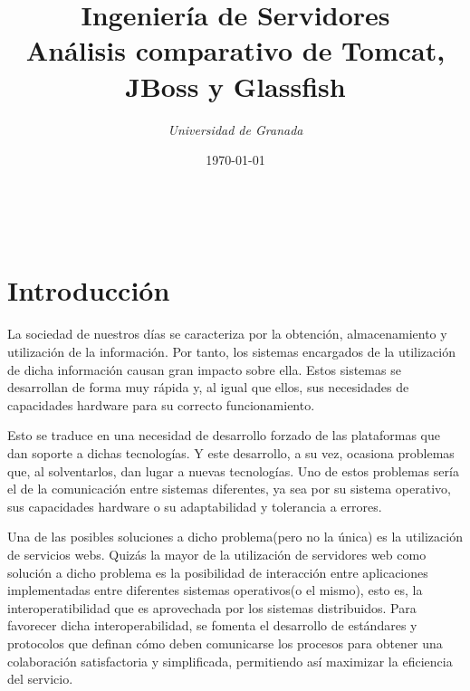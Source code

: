 \documentclass[a4paper, 10pt]{article}
\title{\textbf{Ingeniería de Servidores}\\ %
Análisis comparativo de Tomcat, JBoss y Glassfish} %
\author{ %
{\textit{Universidad de Granada}}} %
\date{\today} %
\makeatletter
\renewcommand{\maketitle}{
  \begin{flushright} %
  
  {\LARGE\@title} %
  
  \vspace{50pt} %
  
  {\large\@author} %
  \\\@date %
  \vspace{40pt} %
  \end{flushright}
}
\makeatother
\begin{document}
\maketitle %

\renewcommand{\abstractname}{Resumen} %
\begin{abstract}
\end{abstract}





\section{Introducción}
	La sociedad de nuestros días se caracteriza por la obtención, almacenamiento y
	utilización de la información. Por tanto, los sistemas encargados de la utilización
	de dicha información causan gran impacto sobre ella. Estos sistemas se desarrollan
	de forma muy rápida y, al igual que ellos, sus necesidades de capacidades hardware
	para su correcto funcionamiento.
	
	Esto se traduce en una necesidad de desarrollo forzado de las plataformas que dan
	soporte a dichas tecnologías. Y este desarrollo, a su vez, ocasiona problemas que,
	al solventarlos, dan lugar a nuevas tecnologías. Uno de estos problemas sería el de
	la comunicación entre sistemas diferentes, ya sea por su sistema operativo, sus
	capacidades hardware o su adaptabilidad y tolerancia a errores.
	
	Una de las posibles soluciones a dicho problema(pero no la única) es la utilización
	de servicios webs. Quizás la mayor de la utilización de servidores web como solución
	a dicho problema es la posibilidad de interacción entre aplicaciones implementadas
	entre diferentes sistemas operativos(o el mismo), esto es, la interoperatibilidad que
	es aprovechada por los sistemas distribuidos. Para favorecer dicha interoperabilidad,
	se fomenta el desarrollo de estándares y protocolos que definan cómo deben comunicarse
	los procesos para obtener una colaboración satisfactoria y simplificada, permitiendo
	así maximizar la eficiencia del servicio.
	
\end{document}

